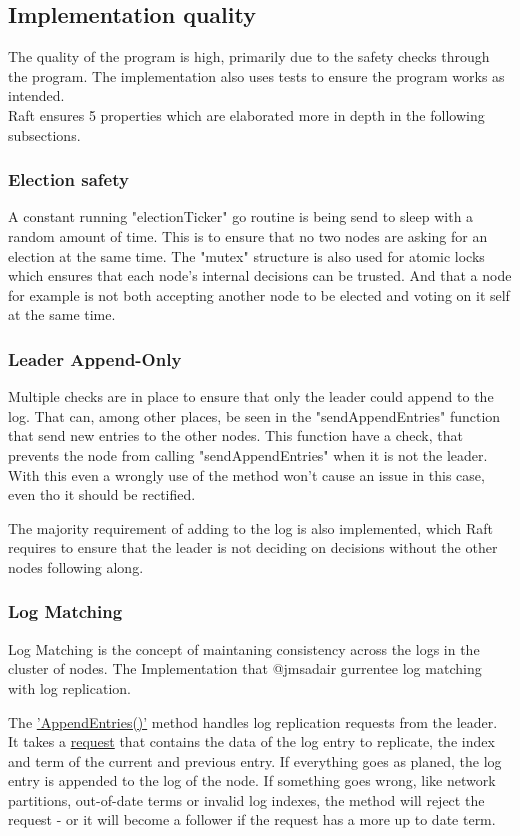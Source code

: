 \documentclass[a4paper,11pt]{article}
\begin{document}
\subsection*{Implementation quality}
The quality of the program is high, primarily due to the safety checks through the program. The implementation also uses tests to ensure the program works as intended.
\\Raft ensures 5 properties which are elaborated more in depth in the following subsections.

\subsubsection*{Election safety}
A constant running "electionTicker" go routine is being send to sleep with a random amount of time.
This is to ensure that no two nodes are asking for an election at the same time.
The "mutex" structure is also used for atomic locks which ensures that each node's internal decisions can be trusted.
And that a node for example is not both accepting another node to be elected and voting on it self at the same time.

\subsubsection*{Leader Append-Only}
Multiple checks are in place to ensure that only the leader could append to the log.
That can, among other places, be seen in the "sendAppendEntries" function that send new entries to the other nodes.
This function have a check, that prevents the node from calling "sendAppendEntries" when it is not the leader.
With this even a wrongly use of the method won't cause an issue in this case, even tho it should be rectified.

The majority requirement of adding to the log is also implemented, 
which Raft requires to ensure that the leader is not deciding on decisions without the other nodes following along.

\subsubsection*{Log Matching}
Log Matching is the concept of maintaning consistency across the logs in the cluster of nodes. The Implementation that @jmsadair gurrentee log matching with log replication.

The \href{https://github.com/jmsadair/raft/blob/dev/raft.go#L797}{'AppendEntries()'} method handles log replication requests from the leader. It takes a \href{https://github.com/jmsadair/raft/blob/c7c645603a7a495d858771f1e91f8b5a76cd798d/internal/protobuf/raft.proto#L17}{request} that contains the data of the log entry to replicate, the index and term of the current and previous entry.
If everything goes as planed, the log entry is appended to the log of the node.
If something goes wrong, like network partitions, out-of-date terms or invalid log indexes, the method will reject the request - or it will become a follower if the request has a more up to date term.
\end{document}
